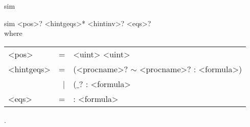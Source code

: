 \begin{tactic}{sim}
  \begin{tsyntax}{sim <pos>? <hintgeqs>* <hintinv>? <eqs>?}\\
    where \begin{tabular}{lrl}
       <pos>      & = & <uint> <uint> \\
       <hintgeqs> & = & (<procname>? $\sim$ <procname>? : <formula>) \\
                  & | & ($\_$? : <formula>  \\
       <eqs>      & = & : <formula> \\
    \end{tabular}
  
  .
  \end{tsyntax}
\end{tactic}
